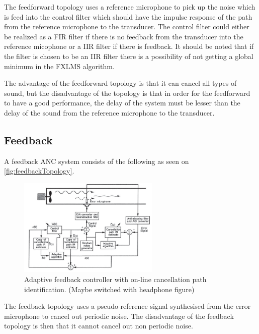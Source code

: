 The feedforward topology uses a reference microphone to pick up the noise which is feed into the control filter which should have the impulse response of the path from the reference microphone to the transducer. The control filter could either be realized as a FIR filter if there is no feedback from the transducer into the reference micophone or a IIR filter if there is feedback. It should be noted that if the filter is chosen to be an IIR filter there is a possibility of not getting a global minimum in the FXLMS algorithm.

The advantage of the feedforward topology is that it can cancel all types of sound, but the disadvantage of the topology is that in order for the feedforward to have a good performance, the delay of the system must be lesser than the delay of the sound from the reference microphone to the transducer.    




\subsection*{Feedback}
A feedback ANC system consists of the following as seen on \autoref{fig:feedbackTopology}.
\begin{figure}[H]
	\centering
	\includegraphics[width=0.6\textwidth]{figures/BasicSystem/feedback}
	\caption{Adaptive feedback controller with on-line cancellation path identification. (Maybe switched with headphone figure)}
	\label{fig:feedbackTopology}
\end{figure}

The feedback topology uses a pseudo-reference signal synthesised from the error microphone to cancel out periodic noise. The disadvantage of the feedback topology is then that it cannot cancel out non periodic noise.    




